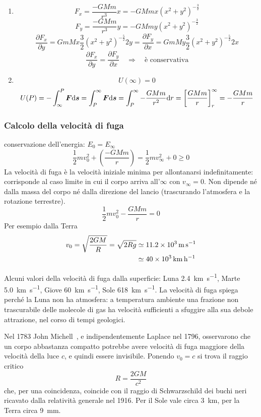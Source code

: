 \begin{Es}[Forza gravitazionale $ \ve{F}=-G\frac{Mm}{{r^3}}\ve r \quad
      r=\sqrt{x^2+y^2}$]

  \begin{enumerate}

    \item
          \[F_x=\frac {-GMm}{r^3}x=-GMmx(x^2+y^2)^{-\frac{3}{2}}\]
          \[F_y=\frac {-GMm}{r^3}y=-GMmy(x^2+y^2)^{-\frac{3}{2}}\]
          \[\frac{\partial F_x}{\partial y}=GmMx\frac {3}{2}(x^2+y^2)^{-\frac{5}{2}}2y=\frac{\partial F_y}{\partial x}=GmMy\frac {3}{2}(x^2+y^2)^{-\frac{5}{2}}2x \]
          \[\frac{\partial F_x}{\partial y}=\frac{\partial F_y}{\partial x}\quad \Rightarrow\quad \text{è conservativa}\]

          \item\[U(\infty)=0\]
          \[U(P)=-\int_\infty ^P \boldsymbol{F} \mathrm{d} \boldsymbol{s}=\int_P^\infty \boldsymbol{F}\mathrm{d} \boldsymbol{s}=\int_P^\infty -\frac{GMm}{r^2}\mathrm{d} r=\left[\frac{GMm}{r}\right]_r^\infty=-\frac{GMm}{r}\]
  \end{enumerate}
\end{Es}
\subsubsection{Calcolo della velocità di fuga}

conservazione dell'energia: $E_0=E_\infty$
\[\frac{1}{2}mv_0^2+\left(\frac{-GMm}{r}\right)=\frac{1}{2}mv_\infty^2+0\geq0\]
La velocità di fuga è la velocità iniziale minima per allontanarsi indefinitamente: corrisponde al caso limite in cui il corpo arriva all'$\infty$ con $v_\infty=0$. Non dipende né dalla massa del corpo né dalla direzione del lancio (trascurando l'atmosfera e la rotazione terrestre).
\[\frac{1}{2}mv_0^2-\frac{GMm}{r}=0\]
Per esempio dalla Terra
\begin{align*}
  v_0=\sqrt{\frac{2GM}{R}}=\sqrt{2Rg} & \simeq \SI{11.2E3}{\meter\per\second}    \\
                                      & \simeq \SI{40E3}{\kilo\meter\per\hour}
\end{align*}




Alcuni valori della velocità di fuga dalla superficie: Luna \SI{2.4}{\kilo\meter\per\second}, Marte \SI{5.0}{\kilo\meter\per\second}, Giove \SI{60}{\kilo\meter\per\second}, Sole \SI{618}{\kilo\meter\per\second}. La velocità di fuga spiega perché la Luna non ha atmosfera: a temperatura ambiente una frazione non trascurabile delle molecole di gas ha velocità sufficienti a sfuggire alla sua debole attrazione, nel corso di tempi geologici.
\begin{Es}
  Nel 1783 John Michell~\cite{michell1784}, e indipendentemente Laplace nel 1796, osservarono che un corpo abbastanza compatto potrebbe avere velocità di fuga maggiore della velocità della luce $c$, e quindi essere invisibile. Ponendo $v_0=c$ si trova il raggio critico
  \[
    R=\frac{2GM}{c^2}
  \]
  che, per una coincidenza, coincide con il raggio di Schwarzschild dei buchi neri ricavato dalla relatività generale nel 1916. Per il Sole vale circa \SI{3}{\kilo\meter}, per la Terra circa \SI{9}{\milli\meter}.
\end{Es}
